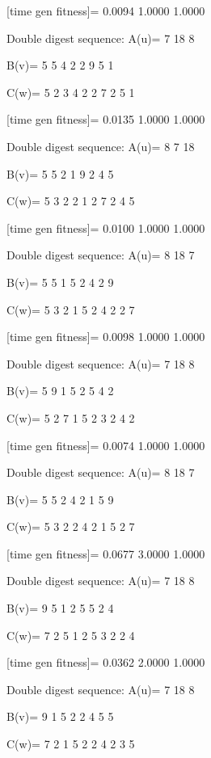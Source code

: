 [time gen fitness]=
    0.0094    1.0000    1.0000

Double digest sequence:
A(u)=
     7    18     8

B(v)=
     5     5     4     2     2     9     5     1

C(w)=
     5     2     3     4     2     2     7     2     5     1

[time gen fitness]=
    0.0135    1.0000    1.0000

Double digest sequence:
A(u)=
     8     7    18

B(v)=
     5     5     2     1     9     2     4     5

C(w)=
     5     3     2     2     1     2     7     2     4     5

[time gen fitness]=
    0.0100    1.0000    1.0000

Double digest sequence:
A(u)=
     8    18     7

B(v)=
     5     5     1     5     2     4     2     9

C(w)=
     5     3     2     1     5     2     4     2     2     7

[time gen fitness]=
    0.0098    1.0000    1.0000

Double digest sequence:
A(u)=
     7    18     8

B(v)=
     5     9     1     5     2     5     4     2

C(w)=
     5     2     7     1     5     2     3     2     4     2

[time gen fitness]=
    0.0074    1.0000    1.0000

Double digest sequence:
A(u)=
     8    18     7

B(v)=
     5     5     2     4     2     1     5     9

C(w)=
     5     3     2     2     4     2     1     5     2     7

[time gen fitness]=
    0.0677    3.0000    1.0000

Double digest sequence:
A(u)=
     7    18     8

B(v)=
     9     5     1     2     5     5     2     4

C(w)=
     7     2     5     1     2     5     3     2     2     4

[time gen fitness]=
    0.0362    2.0000    1.0000

Double digest sequence:
A(u)=
     7    18     8

B(v)=
     9     1     5     2     2     4     5     5

C(w)=
     7     2     1     5     2     2     4     2     3     5


